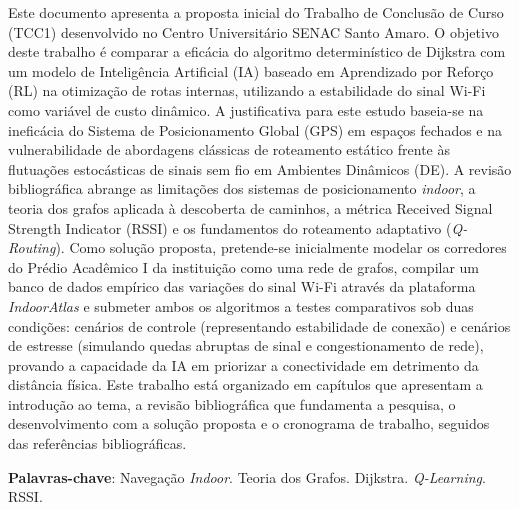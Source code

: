 \documentclass[
    12pt,                %
    openright,           %
    oneside,             %
    a4paper,             %
    english,             %
    brazil               %
]{abntex2}
\begin{document}

\frenchspacing

\pretextual

\imprimircapa

\imprimirfolhaderosto

\begin{resumo}
Este documento apresenta a proposta inicial do Trabalho de Conclusão de Curso (TCC1) desenvolvido no Centro Universitário SENAC Santo Amaro. O objetivo deste trabalho é comparar a eficácia do algoritmo determinístico de Dijkstra com um modelo de Inteligência Artificial (IA) baseado em Aprendizado por Reforço (RL) na otimização de rotas internas, utilizando a estabilidade do sinal Wi-Fi como variável de custo dinâmico. A justificativa para este estudo baseia-se na ineficácia do Sistema de Posicionamento Global (GPS) em espaços fechados e na vulnerabilidade de abordagens clássicas de roteamento estático frente às flutuações estocásticas de sinais sem fio em Ambientes Dinâmicos (DE). A revisão bibliográfica abrange as limitações dos sistemas de posicionamento \textit{indoor}, a teoria dos grafos aplicada à descoberta de caminhos, a métrica Received Signal Strength Indicator (RSSI) e os fundamentos do roteamento adaptativo (\textit{Q-Routing}). Como solução proposta, pretende-se inicialmente modelar os corredores do Prédio Acadêmico I da instituição como uma rede de grafos, compilar um banco de dados empírico das variações do sinal Wi-Fi através da plataforma \textit{IndoorAtlas} e submeter ambos os algoritmos a testes comparativos sob duas condições: cenários de controle (representando estabilidade de conexão) e cenários de estresse (simulando quedas abruptas de sinal e congestionamento de rede), provando a capacidade da IA em priorizar a conectividade em detrimento da distância física. Este trabalho está organizado em capítulos que apresentam a introdução ao tema, a revisão bibliográfica que fundamenta a pesquisa, o desenvolvimento com a solução proposta e o cronograma de trabalho, seguidos das referências bibliográficas.

\vspace{\onelineskip}

\noindent
\textbf{Palavras-chave}: Navegação \textit{Indoor}. Teoria dos Grafos. Dijkstra. \textit{Q-Learning}. RSSI.
\end{resumo}
\end{document}
